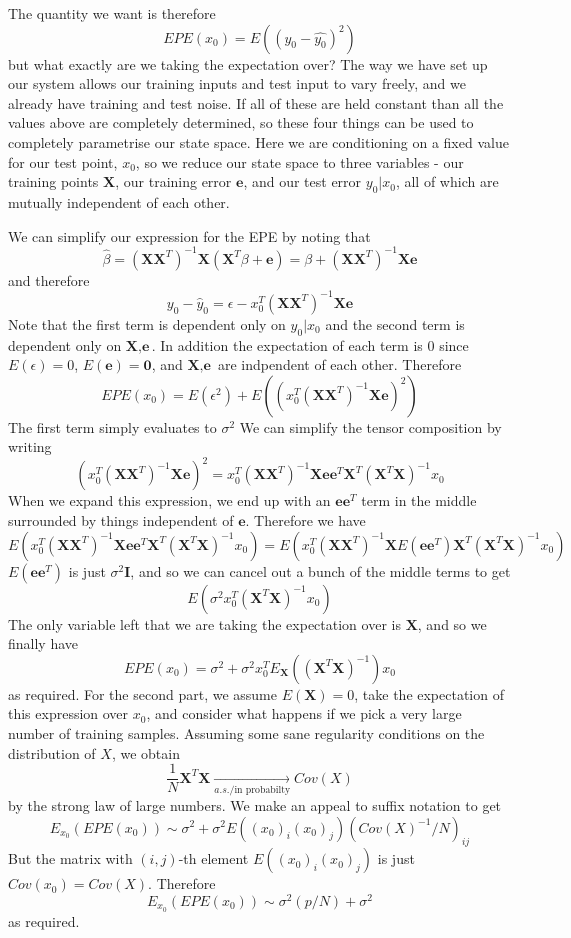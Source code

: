 \documentclass{article}
\newcommand{\chapternumber}{1}
\newenvironment{QandA}{\begin{enumerate}[label=\chapternumber.\arabic*]\bfseries\boldmath}
	{\end{enumerate}}
\newenvironment{answered}{\par\bigskip\normalfont\unboldmath}{}
\begin{document}
\begin{QandA}
\begin{answered}
		The quantity we want is therefore
		\[EPE(x_0)=E((y_0-\hat{y_0})^2)\]
		but what exactly are we taking the expectation over? The way we have set up our system allows our training inputs and test input to vary freely, and we already have training and test noise. If all of these are held constant than all the values above are completely determined, so these four things can be used to completely parametrise our state space. Here we are conditioning on a fixed value for our test point, $x_0$, so we reduce our state space to three variables - our training points $\textbf{X}$, our training error $\textbf{e}$, and our test error $y_0|x_0$, all of which are mutually independent of each other. 
		
		We can simplify our expression for the EPE by noting that 
		\[\hat{\beta}=(\textbf{X}\textbf{X}^T)^{-1}\textbf{X}(\textbf{X}^T\beta+\textbf{e})=\beta+(\textbf{X}\textbf{X}^T)^{-1}\textbf{X}\textbf{e}\]
		and therefore
		\[y_0-\hat{y}_0=\epsilon-x_0^T(\textbf{X}\textbf{X}^T)^{-1}\textbf{X}\textbf{e}\]
		Note that the first term is dependent only on $y_0|x_0$ and the second term is dependent only on $\textbf{X},\textbf{e}$. In addition the expectation of each term is 0 since $E(\epsilon)=0$, $E(\textbf{e})=\textbf{0}$, and $\textbf{X},\textbf{e}$ are indpendent of each other. Therefore 
		\[EPE(x_0)=E(\epsilon^2)+E((x_0^T(\textbf{X}\textbf{X}^T)^{-1}\textbf{X}\textbf{e})^2)\]
		The first term simply evaluates to $\sigma^2$
		We can simplify the tensor composition by writing
		\[(x_0^T(\textbf{X}\textbf{X}^T)^{-1}\textbf{X}\textbf{e})^2=x_0^T(\textbf{X}\textbf{X}^T)^{-1}\textbf{X}\textbf{e}\textbf{e}^T\textbf{X}^T(\textbf{X}^T\textbf{X})^{-1}x_0\]
		When we expand this expression, we end up with an $\textbf{e}\textbf{e}^T$ term in the middle surrounded by things independent of $\textbf{e}$. Therefore we have
		\[E(x_0^T(\textbf{X}\textbf{X}^T)^{-1}\textbf{X}\textbf{e}\textbf{e}^T\textbf{X}^T(\textbf{X}^T\textbf{X})^{-1}x_0) = E(x_0^T(\textbf{X}\textbf{X}^T)^{-1}\textbf{X}E(\textbf{e}\textbf{e}^T)\textbf{X}^T(\textbf{X}^T\textbf{X})^{-1}x_0)\]
		$E(\textbf{e}\textbf{e}^T)$ is just $\sigma^2\textbf{I}$, and so we can cancel out a bunch of the middle terms to get
		\[E(\sigma^2x_0^T(\textbf{X}^T\textbf{X})^{-1}x_0)\]
		The only variable left that we are taking the expectation over is $\textbf{X}$, and so we finally have
		\[EPE(x_0)=\sigma^2+\sigma^2x_0^TE_\textbf{X}((\textbf{X}^T\textbf{X})^{-1})x_0\]
		as required.
		For the second part, we assume $E(\textbf{X})=0$, take the expectation of this expression over $x_0$, and consider what happens if we pick a very large number of training samples. Assuming some sane regularity conditions on the distribution of $X$, we obtain
		\[\frac{1}{N}\textbf{X}^T\textbf{X}\xrightarrow[a.s./\text{in probabilty}]{}Cov(X)\]
		by the strong law of large numbers.
		We make an appeal to suffix notation to get
		\[E_{x_0}(EPE(x_0)) \sim \sigma^2+\sigma^2E((x_0)_i(x_0)_j)(Cov(X)^{-1}/N)_{ij}\]
		But the matrix with $(i,j)$-th element $E((x_0)_i(x_0)_j)$ is just $Cov(x_0)=Cov(X)$. Therefore 
		\[E_{x_0}(EPE(x_0))\sim\sigma^2(p/N)+\sigma^2\]
		as required.
	\end{answered}


\end{QandA}
\end{document}
